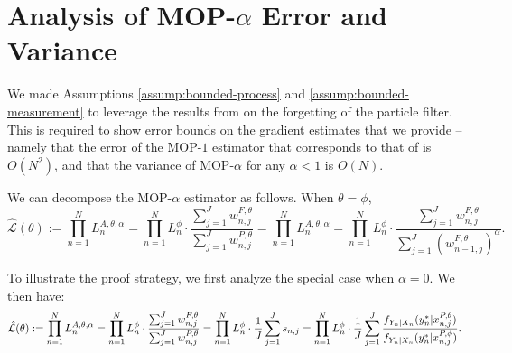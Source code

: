 \documentclass{article}
\begin{document}


\section{Analysis of MOP-$\alpha$ Error and Variance}

We made Assumptions \ref{assump:bounded-process} and \ref{assump:bounded-measurement} to leverage the results from \cite{karjalainen2023} on the forgetting of the particle filter. This is required to show error bounds on the gradient estimates that we provide -- namely that the error of the MOP-$1$ estimator that corresponds to that of \cite{poyiadjis11} is $O(N^2)$, and that the variance of MOP-$\alpha$ for any $\alpha<1$ is $O(N)$. 

We can decompose the MOP-$\alpha$ estimator as follows. When $\theta=\phi$,
$$\hat{\mathcal{L}}(\theta):=\prod_{n=1}^N L_n^{A, \theta, \alpha}=\prod_{n=1}^N L_n^\phi \cdot \frac{\sum_{j=1}^J w_{n, j}^{F, \theta}}{\sum_{j=1}^J w_{n, j}^{P, \theta}}=\prod_{n=1}^N L_n^{A, \theta, \alpha}=\prod_{n=1}^N L_n^\phi \cdot \frac{\sum_{j=1}^J w_{n, j}^{F, \theta}}{\sum_{j=1}^J (w_{n-1, j}^{F, \theta})^\alpha}.$$

To illustrate the proof strategy, we first analyze the special case when $\alpha=0.$ We then have:
\begin{equation}
    \hat{\mathcal{L}}(\theta) := \prod_{n=1}^N L_n^{A, \theta, \alpha} = \prod_{n=1}^N L_n^\phi \cdot \frac{\sum_{j=1}^J w_{n,j}^{F,\theta}}{\sum_{j=1}^J w_{n,j}^{P,\theta}} = \prod_{n=1}^N L_n^\phi \cdot \frac{1}{J}\sum_{j=1}^J s_{n,j} = \prod_{n=1}^N L_n^\phi \cdot \frac{1}{J}\sum_{j=1}^J \frac{f_{Y_n|X_n}(y_n^*|x_{n,j}^{P, \theta})}{f_{Y_n|X_n}(y_n^*|x_{n,j}^{P, \phi})}.
\end{equation}
\end{document}
